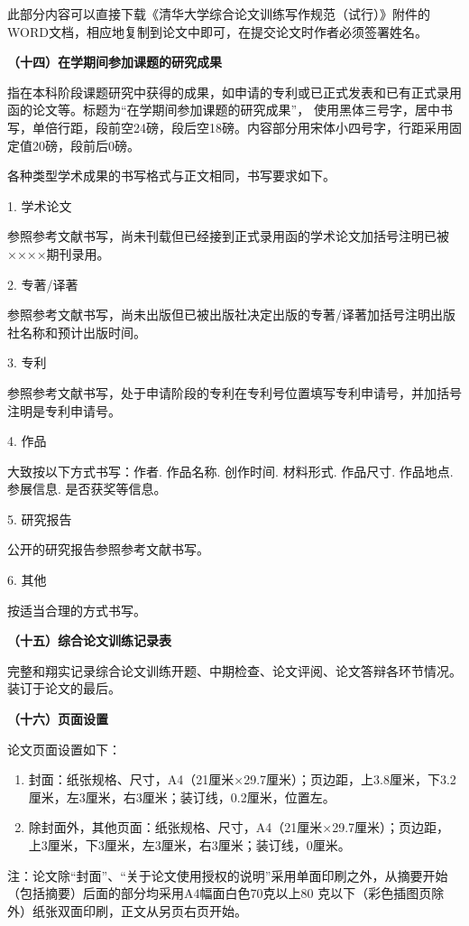 \documentclass{Diploma}
\begin{document}
此部分内容可以直接下载《清华大学综合论文训练写作规范（试行）》附件的WORD文档，相应地复制到论文中即可，在提交论文时作者必须签署姓名。

\noindent\textbf{（十四）在学期间参加课题的研究成果}

指在本科阶段课题研究中获得的成果，如申请的专利或已正式发表和已有正式录用函的论文等。标题为“在学期间参加课题的研究成果”， 使用黑体三号字，居中书写，单倍行距，段前空24磅，段后空18磅。内容部分用宋体小四号字，行距采用固定值20磅，段前后0磅。

各种类型学术成果的书写格式与正文相同，书写要求如下。

1. 学术论文

参照参考文献书写，尚未刊载但已经接到正式录用函的学术论文加括号注明已被××××期刊录用。

2. 专著/译著

参照参考文献书写，尚未出版但已被出版社决定出版的专著/译著加括号注明出版社名称和预计出版时间。

3. 专利

参照参考文献书写，处于申请阶段的专利在专利号位置填写专利申请号，并加括号注明是专利申请号。

4. 作品

大致按以下方式书写：作者. 作品名称. 创作时间. 材料形式. 作品尺寸. 作品地点. 参展信息. 是否获奖等信息。

5. 研究报告

公开的研究报告参照参考文献书写。

6. 其他

按适当合理的方式书写。

\noindent\textbf{（十五）综合论文训练记录表}

完整和翔实记录综合论文训练开题、中期检查、论文评阅、论文答辩各环节情况。装订于论文的最后。

\noindent\textbf{（十六）页面设置}

论文页面设置如下：
\begin{enumerate}
  \item 封面：纸张规格、尺寸，A4（21厘米×29.7厘米）；页边距，上3.8厘米，下3.2厘米，左3厘米，右3厘米；装订线，0.2厘米，位置左。
  \item 除封面外，其他页面：纸张规格、尺寸，A4（21厘米×29.7厘米）；页边距，上3厘米，下3厘米，左3厘米，右3厘米；装订线，0厘米。
\end{enumerate}
注：论文除“封面”、“关于论文使用授权的说明”采用单面印刷之外，从摘要开始（包括摘要）后面的部分均采用A4幅面白色70克以上80 克以下（彩色插图页除外）纸张双面印刷，正文从另页右页开始。
\end{document}
